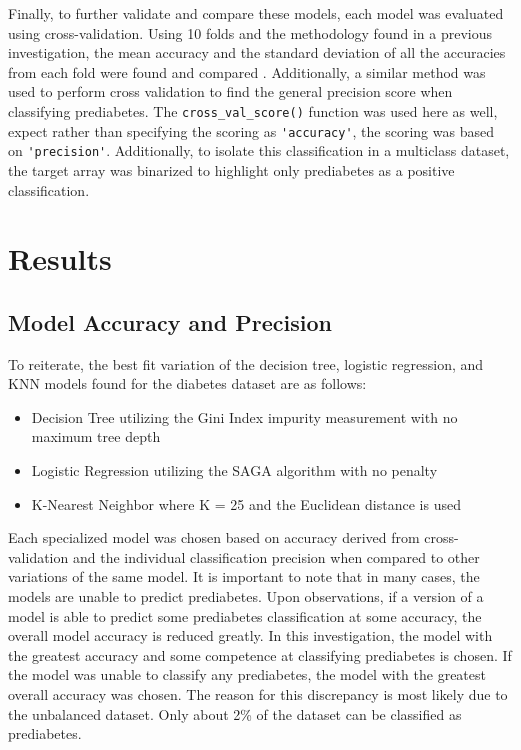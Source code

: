 \documentclass[journal]{IEEEtran}
\begin{document}
Finally, to further validate and compare these models, each model was evaluated using cross-validation. Using 10 folds and the methodology found in a previous investigation, the mean accuracy and the standard deviation of all the accuracies from each fold were found and compared \cite{b12}. Additionally, a similar method was used to perform cross validation to find the general precision score when classifying prediabetes. The \lstinline{cross_val_score()} function was used here as well, expect rather than specifying the scoring as \lstinline{'accuracy'}, the scoring was based on \lstinline{'precision'}. Additionally, to isolate this classification in a multiclass dataset, the target array was binarized to highlight only prediabetes as a positive classification. 

\section{Results}
\label{sec:results}

\subsection{Model Accuracy and Precision}

To reiterate, the best fit variation of the decision tree, logistic regression, and KNN models found for the diabetes dataset are as follows: 
\begin{itemize}
    \item Decision Tree utilizing the Gini Index impurity measurement with no maximum tree depth
    \item Logistic Regression utilizing the SAGA algorithm with no penalty
    \item K-Nearest Neighbor where K = 25 and the Euclidean distance is used
\end{itemize} 

Each specialized model was chosen based on accuracy derived from cross-validation and the individual classification precision when compared to other variations of the same model. It is important to note that in many cases, the models are unable to predict prediabetes. Upon observations, if a version of a model is able to predict some prediabetes classification at some accuracy, the overall model accuracy is reduced greatly. In this investigation, the model with the greatest accuracy and some competence at classifying prediabetes is chosen. If the model was unable to classify any prediabetes, the model with the greatest overall accuracy was chosen. The reason for this discrepancy is most likely due to the unbalanced dataset. Only about 2\% of the dataset can be classified as prediabetes.
 
\end{document}
